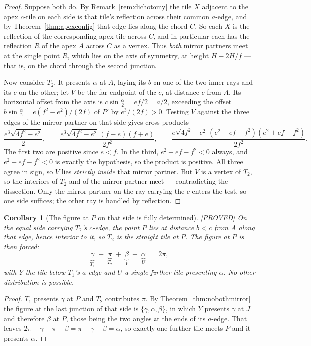 \documentclass[11pt,reqno]{amsart}
\theoremstyle{plain}
\newtheorem{corollary}[theorem]{Corollary}
\theoremstyle{definition}
\newcommand{\lab}[1]{\hfill\textnormal{\footnotesize\textsc{[#1]}}}
\begin{document}
\begin{proof}
Suppose both do. By Remark~\ref{rem:dichotomy} the tile $X$ adjacent to the apex $c$-tile on each side
is that tile's reflection across their common $a$-edge, and by Theorem~\ref{thm:apexconfig} that edge
lies along the chord $C$. So each $X$ is the reflection of the corresponding apex tile across $C$, and
in particular each has the reflection $R$ of the apex $A$ across $C$ as a vertex. Thus \emph{both}
mirror partners meet at the single point $R$, which lies on the axis of symmetry, at height
$H-2H/f$ --- that is, on the chord through the second junction.

Now consider $T_2$. It presents $\alpha$ at $A$, laying its $b$ on one of the two inner rays and its
$c$ on the other; let $V$ be the far endpoint of the $c$, at distance $c$ from $A$. Its horizontal
offset from the axis is $c\sin\frac{\alpha}{2}=ef/2=a/2$, exceeding the offset
$b\sin\frac{\alpha}{2}=e(f^{2}-e^{2})/(2f)$ of $P'$ by $e^{3}/(2f)>0$. Testing $V$ against the three
edges of the mirror partner on that side gives cross products
\[
\frac{e^{3}\sqrt{4f^{2}-e^{2}}}{2},\qquad
\frac{e^{3}\sqrt{4f^{2}-e^{2}}\,(f-e)(f+e)}{2f^{2}},\qquad
\frac{e\sqrt{4f^{2}-e^{2}}\,(e^{2}-ef-f^{2})(e^{2}+ef-f^{2})}{2f^{2}} .
\]
The first two are positive since $e<f$. In the third, $e^{2}-ef-f^{2}<0$ always, and
$e^{2}+ef-f^{2}<0$ is exactly the hypothesis, so the product is positive. All three agree in sign, so
$V$ lies \emph{strictly inside} that mirror partner. But $V$ is a vertex of $T_2$, so the interiors of
$T_2$ and of the mirror partner meet --- contradicting the dissection. Only the mirror partner on the
ray carrying the $c$ enters the test, so one side suffices; the other ray is handled by reflection.
\end{proof}

\begin{corollary}[The figure at $P$ on that side is fully determined]\label{cor:figureP}\lab{PROVED}
On the equal side carrying $T_2$'s $c$-edge, the point $P$ lies at distance $b<c$ from $A$ along that
edge, hence interior to it, so $T_2$ is the straight tile at $P$. The figure at $P$ is then forced:
\[
\underbrace{\gamma}_{T_1}\;+\;\underbrace{\pi}_{T_2}\;+\;\underbrace{\beta}_{Y}\;+\;\underbrace{\alpha}_{U}\;=\;2\pi ,
\]
with $Y$ the tile below $T_1$'s $a$-edge and $U$ a single further tile presenting $\alpha$. No other
distribution is possible.
\end{corollary}

\begin{proof}
$T_1$ presents $\gamma$ at $P$ and $T_2$ contributes $\pi$. By Theorem~\ref{thm:nobothmirror} the
figure at the last junction of that side is $\{\gamma,\alpha,\beta\}$, in which $Y$ presents $\gamma$
at $J$ and therefore $\beta$ at $P$, those being the two angles at the ends of its $a$-edge. That
leaves $2\pi-\gamma-\pi-\beta=\pi-\gamma-\beta=\alpha$, so exactly one further tile meets $P$ and it
presents $\alpha$.
\end{proof}
\end{document}
